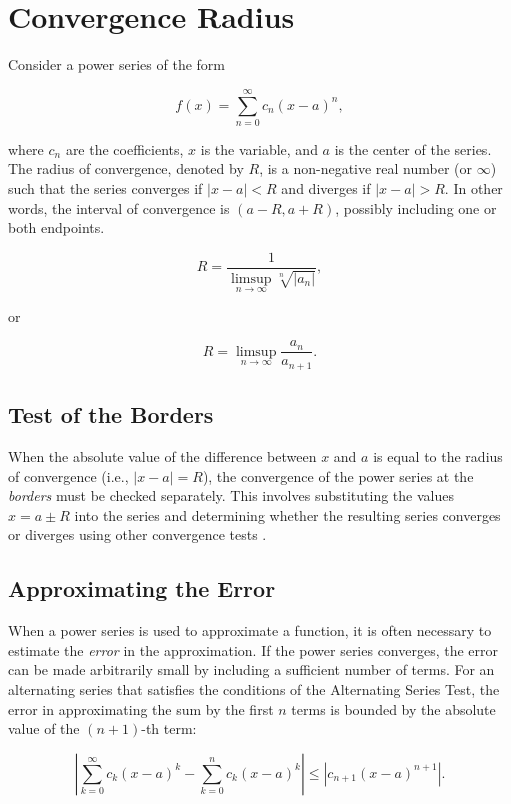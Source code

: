 \chapter{Convergence Radius}

Consider a power series of the form

\[
    f(x) = \sum_{n=0}^{\infty} c_n {(x - a)}^n,
\]

where \(c_n\) are the coefficients, \(x\) is the variable, and \(a\) is the center of the series. The radius of convergence, denoted by \(R\), is a 
non-negative real number (or \(\infty\)) such that the series converges if \(|x - a| < R\) and diverges if \(|x - a| > R\). In other words, 
the interval of convergence is \((a - R, a + R)\), possibly including one or both endpoints.

\[
    R = \frac{1}{\limsup_{n \to \infty} \sqrt[n]{|a_n|}},
\]

or

\[
    R = \limsup_{n \to \infty} \frac{a_n}{ a_{n + 1}}.
\]

\section{Test of the Borders}

When the absolute value of the difference between \(x\) and \(a\) is equal to the radius of convergence 
(i.e., \(|x - a| = R\)), the convergence of the power series at the \emph{borders} must be checked separately. This involves 
substituting the values \(x = a \pm R\) into the series and determining whether the resulting series 
converges or diverges using other convergence tests .

\section{Approximating the Error}

When a power series is used to approximate a function, it is often necessary to estimate the \emph{error} in the 
approximation. If the power series converges, the error can be made arbitrarily small by including a 
sufficient number of terms. For an alternating series that satisfies the conditions of the Alternating 
Series Test, the error in approximating the sum by the first \(n\) terms is bounded by the absolute value 
of the \((n+1)\)-th term:

\[
    \left| \sum_{k=0}^{\infty} c_k {(x - a)}^k - \sum_{k=0}^{n} c_k {(x - a)}^k \right| \leq |c_{n+1} {(x - a)}^{n+1}|.
\]

